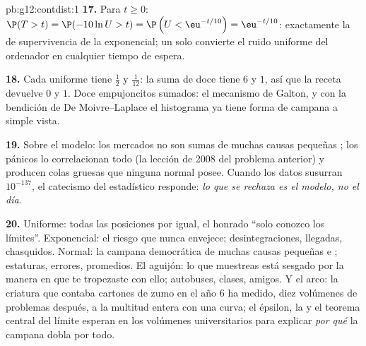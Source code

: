 \begin{solution}{pb:g12:contdist:1}
\textbf{17.} Para $t \geq 0$:
$\P(T > t) = \P(-10\ln U > t) = \P\left(U < \eu^{-t/10}\right) =
\eu^{-t/10}$: exactamente la  de supervivencia de la exponencial;
un solo  convierte el ruido uniforme del ordenador en cualquier
tiempo de espera.

\textbf{18.} Cada uniforme tiene  $\frac12$ y 
$\frac{1}{12}$: la suma de doce tiene  $6$ y  $1$, así que la
receta devuelve  $0$ y  $1$. Doce empujoncitos 
sumados: el mecanismo de Galton, y con la bendición de De Moivre--Laplace
el histograma ya tiene forma de campana a simple vista.

\textbf{19.} Sobre el modelo: los mercados no son sumas de muchas causas
pequeñas \emph{}; los pánicos lo correlacionan todo (la
lección de 2008 del problema anterior) y producen colas gruesas que ninguna
 normal posee. Cuando los datos susurran $10^{-137}$, el catecismo
del estadístico responde: \emph{lo que se rechaza es el modelo, no el
día}.

\textbf{20.} Uniforme: todas las posiciones por igual, el honrado ``solo
conozco los límites''. Exponencial: el riesgo que nunca envejece;
desintegraciones, llegadas, chasquidos. Normal: la campana democrática de
muchas causas pequeñas e ; estaturas, errores, promedios. El
aguijón: lo que muestreas está sesgado por la manera en que te tropezaste
con ello; autobuses, clases, amigos. Y el arco: la criatura que contaba
cartones de zumo en el año 6 ha medido, diez volúmenes de problemas
después, a la multitud entera con una curva; el épsilon, la  y el
teorema central del límite esperan en los volúmenes universitarios para
explicar \emph{por qué} la campana dobla por todo.
\end{solution}
